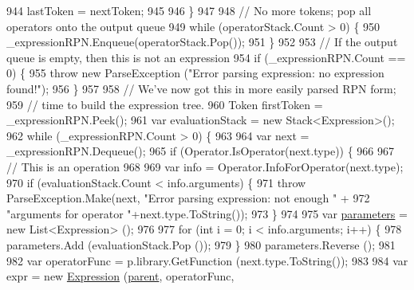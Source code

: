 \begin{DoxyCode}
944                     lastToken = nextToken;
945 
946                 \}
947 
948                 \textcolor{comment}{// No more tokens; pop all operators onto the output queue}
949                 \textcolor{keywordflow}{while} (operatorStack.Count > 0) \{
950                     \_expressionRPN.Enqueue(operatorStack.Pop());
951                 \}
952 
953                 \textcolor{comment}{// If the output queue is empty, then this is not an expression}
954                 \textcolor{keywordflow}{if} (\_expressionRPN.Count == 0) \{
955                     \textcolor{keywordflow}{throw} \textcolor{keyword}{new} ParseException (\textcolor{stringliteral}{"Error parsing expression: no expression found!"});
956                 \}
957 
958                 \textcolor{comment}{// We've now got this in more easily parsed RPN form;}
959                 \textcolor{comment}{// time to build the expression tree.}
960                 Token firstToken = \_expressionRPN.Peek();
961                 var evaluationStack = \textcolor{keyword}{new} Stack<Expression>();
962                 \textcolor{keywordflow}{while} (\_expressionRPN.Count > 0) \{
963 
964                     var next = \_expressionRPN.Dequeue();
965                     \textcolor{keywordflow}{if} (Operator.IsOperator(next.type)) \{
966 
967                         \textcolor{comment}{// This is an operation}
968 
969                         var info = Operator.InfoForOperator(next.type);
970                         \textcolor{keywordflow}{if} (evaluationStack.Count < info.arguments) \{
971                             \textcolor{keywordflow}{throw} ParseException.Make(next, \textcolor{stringliteral}{"Error parsing expression: not enough "} +
972                                 \textcolor{stringliteral}{"arguments for operator "}+next.type.ToString());
973                         \}
974 
975                         var \hyperlink{a00106_a7b21380bead8ae08b2cfc6594edab32c}{parameters} = \textcolor{keyword}{new} List<Expression> ();
976 
977                         \textcolor{keywordflow}{for} (\textcolor{keywordtype}{int} i = 0; i < info.arguments; i++) \{
978                             parameters.Add (evaluationStack.Pop ());
979                         \}
980                         parameters.Reverse ();
981 
982                         var operatorFunc = p.library.GetFunction (next.type.ToString());
983 
984                         var expr = \textcolor{keyword}{new} \hyperlink{a00106_a17e5101d02b96d0071e7a0223e4daa3d}{Expression} (\hyperlink{a00150_af313a82103fcc2ff5a177dbb06b92f7b}{parent}, operatorFunc, 

\end{DoxyCode}
